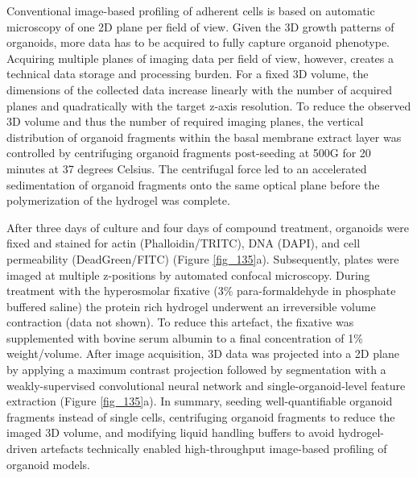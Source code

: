 \begin{flushleft}
\bigbreak

Conventional image-based profiling of adherent cells is based on automatic microscopy of one 2D plane per field of view. Given the 3D growth patterns of organoids, more data has to be acquired to fully capture organoid phenotype. Acquiring multiple planes of imaging data per field of view, however, creates a technical data storage and processing burden. For a fixed 3D volume, the dimensions of the collected data increase linearly with the number of acquired planes and quadratically with the target z-axis resolution. To reduce the observed 3D volume and thus the number of required imaging planes, the vertical distribution of organoid fragments within the basal membrane extract layer was controlled by centrifuging organoid fragments post-seeding at 500G for 20 minutes at 37 degrees Celsius. The centrifugal force led to an accelerated sedimentation of organoid fragments onto the same optical plane before the polymerization of the hydrogel was complete.

\bigbreak

After three days of culture and four days of compound treatment, organoids were fixed and stained for actin (Phalloidin/TRITC), DNA (DAPI), and cell permeability (DeadGreen/FITC) (Figure \ref{fig_135}a). Subsequently, plates were imaged at multiple z-positions by automated confocal microscopy. During treatment with the hyperosmolar fixative (3\% para-formaldehyde in phosphate buffered saline) the protein rich hydrogel underwent an irreversible volume contraction (data not shown). To reduce this artefact, the fixative was supplemented with bovine serum albumin to a final concentration of 1\% weight/volume. After image acquisition, 3D data was projected into a 2D plane by applying a maximum contrast projection followed by segmentation with a weakly-supervised convolutional neural network and single-organoid-level feature extraction (Figure \ref{fig_135}a). In summary, seeding well-quantifiable organoid fragments instead of single cells, centrifuging organoid fragments to reduce the imaged 3D volume, and modifying liquid handling buffers to avoid hydrogel-driven artefacts technically enabled high-throughput image-based profiling of organoid models. 

\end{flushleft}
